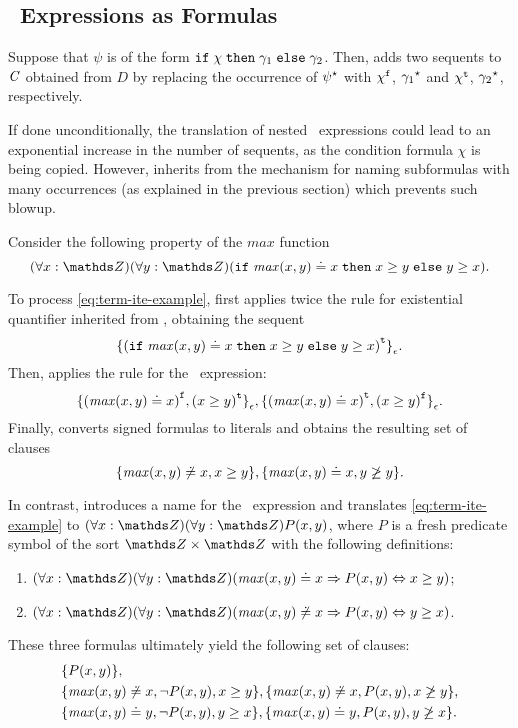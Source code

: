 \subsection*{\ITE\ Expressions as Formulas}
Suppose that $\psi$ is of the form $\mathtt{if}\;{\chi}\;\allowbreak\mathtt{then}\;{\gamma_1}\;\allowbreak\mathtt{else}\;{\gamma_2}$. 
Then, \nfcnf{} adds two sequents to $\mathit{C}$ obtained from $D$ by replacing the occurrence of ${\psi}^{\star}$ with ${\chi}^{\mathtt{f}}$, ${\gamma_1}^{\star}$ and ${\chi}^{\mathtt{t}}$, ${\gamma_2}^{\star}$, respectively.

If done unconditionally, the translation of nested \ITE\ expressions could lead to an exponential increase in the number of sequents,
as the condition formula $\chi$ is being copied. However, \nfcnf{} inherits from \newcnf{} the mechanism 
for naming subformulas with many occurrences (as explained in the previous section) which prevents such blowup.

\begin{example} Consider the following property of the $\mathit{max}$ function
\begin{equation}\label{eq:term-ite-example}
  (\forall x:\Z)(\forall y:\Z)(\ite{\mathit{max}(x, y) \eql x}{x \geq y}{y \geq x}).
\end{equation}

To process \eqref{eq:term-ite-example}, \nfcnf{} first applies twice the rule for existential quantifier inherited from \newcnf{}, obtaining the sequent $${{\{(\mathtt{if}\;{\mathit{max}(x, y) \doteq x}\;\allowbreak\mathtt{then}\;{x \geq y}\;\allowbreak\mathtt{else}\;{y \geq x})}^{\mathtt{t}}\}}_{\epsilon}.$$ Then, \nfcnf{} applies the rule for the \ITE\ expression: $${ \{ {(\mathit{max}(x,y) \doteq x)}^{\mathtt{f}} , {(x \geq y)}^{\mathtt{t}} \} }_{\epsilon}, { \{ {(\mathit{max}(x,y) \doteq x)}^{\mathtt{t}} , {(x \geq y)}^{\mathtt{f}} \} }_{\epsilon}.$$ Finally, \nfcnf{} converts signed formulas to literals and obtains the resulting set of clauses $$\{ \mathit{max}(x,y) \not\doteq x, x \geq y \}, \{ \mathit{max}(x,y) \doteq x, y \not\geq y \}.$$

In contrast, \oldcnf{} introduces a name for the \ITE\ expression and translates \eqref{eq:term-ite-example} to $(\forall x:\Z)(\forall y:\Z)P(x,y)$, where $P$ is a fresh predicate symbol of the sort $\Z \times \Z$ with the following definitions:
\begin{enumerate}
  \item $(\forall x:\Z)(\forall y:\Z)(\mathit{max}(x, y) \eql     x \implies P(x,y) \liff x \geq y)$;
  \item $(\forall x:\Z)(\forall y:\Z)(\mathit{max}(x, y) \not\eql x \implies P(x,y) \liff y \geq x)$.
\end{enumerate}

These three formulas ultimately yield the following set of clauses:
\begin{align*}
&\{P(x,y)\},\\
&\{\mathit{max}(x, y) \not\doteq x, \neg P(x,y), x \geq y\},\{\mathit{max}(x, y) \not\doteq x, P(x,y), x \not\geq y\},\\
&\{\mathit{max}(x, y) \doteq y, \neg P(x,y), y \geq x\},\{\mathit{max}(x, y) \doteq y, P(x,y), y \not\geq x\}.
\end{align*}
\QED\end{example}

